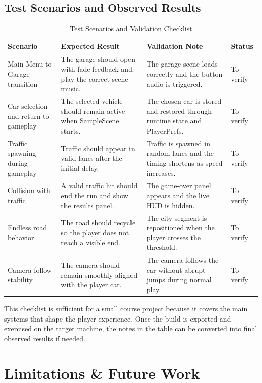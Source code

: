\documentclass[12pt,a4paper]{article}
\begin{document}
\subsection{Test Scenarios and Observed Results}
\begin{table}[!htbp]
\centering
\caption{Test Scenarios and Validation Checklist}
\begin{tabularx}{\textwidth}{@{}L{4.1cm}Y Y L{1.4cm}@{}}
\toprule
Scenario & Expected Result & Validation Note & Status \\
\midrule
Main Menu to Garage transition & The garage should open with fade feedback and play the correct scene music. & The garage scene loads correctly and the button audio is triggered. & To verify \\
Car selection and return to gameplay & The selected vehicle should remain active when SampleScene starts. & The chosen car is stored and restored through runtime state and PlayerPrefs. & To verify \\
Traffic spawning during gameplay & Traffic should appear in valid lanes after the initial delay. & Traffic is spawned in random lanes and the timing shortens as speed increases. & To verify \\
Collision with traffic & A valid traffic hit should end the run and show the results panel. & The game-over panel appears and the live HUD is hidden. & To verify \\
Endless road behavior & The road should recycle so the player does not reach a visible end. & The city segment is repositioned when the player crosses the threshold. & To verify \\
Camera follow stability & The camera should remain smoothly aligned with the player car. & The camera follows the car without abrupt jumps during normal play. & To verify \\
\bottomrule
\end{tabularx}
\end{table}

This checklist is sufficient for a small course project because it covers the main systems that shape the player experience. Once the build is exported and exercised on the target machine, the notes in the table can be converted into final observed results if needed.

\section{Limitations \& Future Work}
\end{document}
